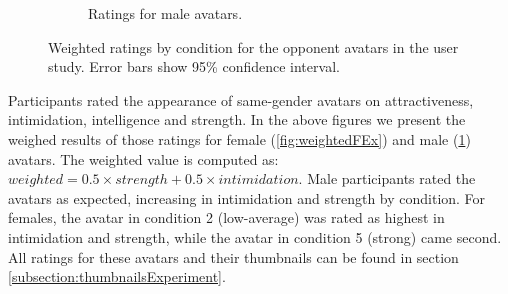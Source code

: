 \begin{figure}[H]
\begin{subfigure}[b]{0.4\textwidth}
         \caption{Ratings for male avatars.}
         \label{fig:weightedMEx}
     \end{subfigure}
      \hspace*{\fill}
     \caption{Weighted ratings by condition for the opponent avatars in the user study. Error bars show 95\%  confidence interval.}
         \label{fig:weightedEX}
\end{figure} 
Participants rated the appearance of same-gender avatars on attractiveness, intimidation, intelligence and strength. In the above  figures we present the weighed results of those ratings for female (\ref{fig:weightedFEx}) and male (\ref{fig:weightedMEx}) avatars. The weighted value is computed as: $weighted=0.5 \times strength+0.5 \times intimidation$.
Male participants rated the avatars as expected, increasing in intimidation and strength by condition. For females, the avatar in condition 2 (low-average) was rated as highest in intimidation and strength, while the avatar in condition 5 (strong) came second. All ratings for these avatars and their thumbnails can be found in section \ref{subsection:thumbnailsExperiment}. \\

